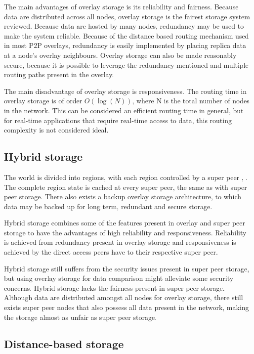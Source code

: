 \documentclass[10pt,a4paper,conference]{IEEEtran}
\begin{document}
The main advantages of overlay storage is its reliability and fairness. Because data are distributed across all nodes, overlay storage is the fairest
storage system reviewed. Because data are hosted by many nodes, redundancy may be used to make the system reliable. Because of the distance based
routing mechanism used in most P2P overlays, redundancy is easily implemented by placing replica data at a node's overlay neighbours. Overlay storage
can also be made reasonably secure, because it is possible to leverage the redundancy mentioned and multiple routing paths present in the overlay.

The main disadvantage of overlay storage is responsiveness. The routing time in overlay storage is of order $O(\log(N))$, where N is the total number
of nodes in the network. This can be considered an efficient routing time in general, but for real-time applications that require real-time access to
data, this routing complexity is not considered ideal.

\subsection{Hybrid storage}

The world is divided into regions, with each region controlled by a super peer \cite{zoned_federation}, \cite{hybrid_storage1}. The complete region
state is cached at every super peer, the same as with super peer storage. There also exists a backup overlay storage architecture, to which data may
be backed up for long term, redundant and secure storage.

Hybrid storage combines some of the features present in overlay and super peer storage to have the advantages of high reliability and responsiveness.
Reliability is achieved from redundancy present in overlay storage and responsiveness is achieved by the direct access peers have to their respective
super peer.

Hybrid storage still suffers from the security issues present in super peer storage, but using overlay storage for data comparison might alleviate
some security concerns. Hybrid storage lacks the fairness present in super peer storage. Although data are distributed amongst all nodes for overlay
storage, there still exists super peer nodes that also possess all data present in the network, making the storage almost as unfair as super peer
storage.

\subsection{Distance-based storage}
\label{classic_distance_based}
\end{document}
